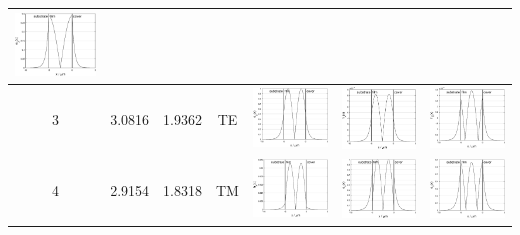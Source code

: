 \documentclass{assignment}
\begin{document}
\begin{sol}
\begin{itemize}
\begin{longtable}[c]{|c|c|c|c|c|c|c|}
      \includegraphics[width=.22\columnwidth]{Assignment-1-Problem-1-WaveGuide-1-ModalAnalysis-Mode-2-Ez.eps} \\ \hline
    3 &
      3.0816 &
      1.9362 &
      TE &
      \includegraphics[width=.22\columnwidth]{Assignment-1-Problem-1-WaveGuide-1-ModalAnalysis-Mode-3-Ey.eps} &
      \includegraphics[width=.22\columnwidth]{Assignment-1-Problem-1-WaveGuide-1-ModalAnalysis-Mode-3-Hx.eps} &
      \includegraphics[width=.22\columnwidth]{Assignment-1-Problem-1-WaveGuide-1-ModalAnalysis-Mode-3-Hz.eps} \\ \hline
    4 &
      2.9154 &
      1.8318 &
      TM &
      \includegraphics[width=.22\columnwidth]{Assignment-1-Problem-1-WaveGuide-1-ModalAnalysis-Mode-4-Hy.eps} &
      \includegraphics[width=.22\columnwidth]{Assignment-1-Problem-1-WaveGuide-1-ModalAnalysis-Mode-4-Ex.eps} &
      \includegraphics[width=.22\columnwidth]{Assignment-1-Problem-1-WaveGuide-1-ModalAnalysis-Mode-4-Ez.eps} \\ \hline

\end{longtable}
\end{itemize}
\end{sol}
\end{document}
